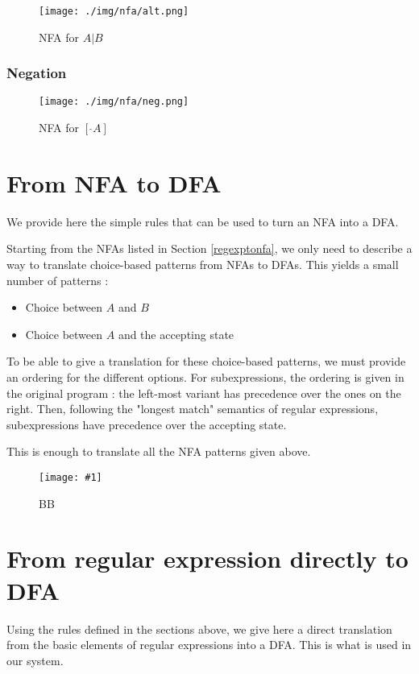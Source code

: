 \documentclass[11pt,a4paper]{report}
\newcommand{\regexp}[1]{$#1$}
\newcommand{\smalldfa}[2]{
\begin{figure}[h!]
	\centering
	\texttt{[image: \#1]}
	\caption{#2}
\end{figure}
}
\begin{document}
\begin{figure}[h!]
	\centering
	\texttt{[image: ./img/nfa/alt.png]}
	\caption{NFA for \regexp{A|B}}
\end{figure}

\subsubsection{Negation}

\begin{figure}[h!]
	\centering
	\texttt{[image: ./img/nfa/neg.png]}
	\caption{NFA for \regexp{[\ \hat{} A]}}
\end{figure}

\section{From NFA to DFA}

We provide here the simple rules that can be used to turn an NFA into a DFA.

Starting from the NFAs listed in Section \ref{regexptonfa}, we only need to describe a way to translate choice-based patterns from NFAs to DFAs. This yields a small number of patterns :
\begin{itemize}
\item Choice between $A$ and $B$
\item Choice between $A$ and the accepting state
\end{itemize}

To be able to give a translation for these choice-based patterns, we must provide an ordering for the different options. For subexpressions, the ordering is given in the original program : the left-most variant has precedence over the ones on the right. Then, following the "longest match" semantics of regular expressions, subexpressions have precedence over the accepting state.

This is enough to translate all the NFA patterns given above.

\smalldfa{./img/nfa/concat.png}{BB}

\section{From regular expression directly to DFA}

Using the rules defined in the sections above, we give here a direct translation from the basic elements of regular expressions into a DFA. This is what is used in our system.
\end{document}
